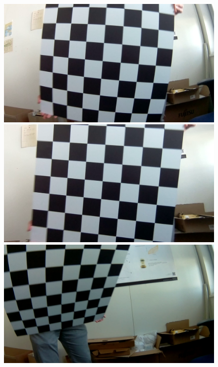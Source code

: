 \begin{figure}[H]
     \begin{minipage}[t]{0.24\textwidth}
        \centering
        \includegraphics[width=.95\textwidth]{image/3/rec_1/1178_og.png}
     \end{minipage}%
     \begin{minipage}[t]{0.24\textwidth}
        \centering
        \includegraphics[width=.95\textwidth]{image/3/rec_1/1178_undist.png}
     \end{minipage}
     \begin{minipage}[t]{0.24\textwidth}
        \centering
        \includegraphics[width=.95\textwidth]{image/3/rec_1/1379_og.png}

\end{minipage}
\end{figure}
